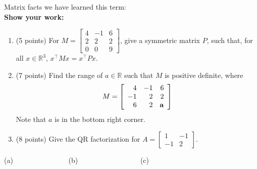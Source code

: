 \documentclass[letterpaper]{article}
\newcommand{\real}{\mathbb R}  %
\begin{document}
%
%



  \newpage

  Matrix facts we have learned this term:\\


\noindent \textbf{Show your work:}

\begin{enumerate}
\setlength{\itemsep}{.15in}
\renewcommand{\labelenumi}{(\alph{enumi})}
\setlength{\itemsep}{.1in}
\item (5 points)  For $M=\left[  \begin{array}{rrr} 4 & -1 & 6 \\ 2 & 2 &2\\0 & 0 & 9\end{array} \right]$, give a symmetric matrix $P$, such that, for all $x\in \real^3$, $x^\top M x=x^\top P x$.
\item (7 points) Find the range of $a\in \real$ such that $M$ is positive definite, where
$$M=\left[  \begin{array}{rrr} 4 & -1 & 6 \\ -1 & 2 &2\\6 & 2 & {\bf a}\end{array} \right]$$
Note that $a$ is in the bottom right corner.

\item (8 points) Give the QR factorization for $A=\left[  \begin{array}{rr} 1 & -1  \\ -1 & 2 \end{array} \right].$
\end{enumerate}




 (a) ~~~~~~~~~~~~~~~(b) \fbox{\rule[-1cm]{0cm}{2cm}   \hskip4cm ~~}~~~~~~~~~~~~~~~~~(c) 
\end{document}

